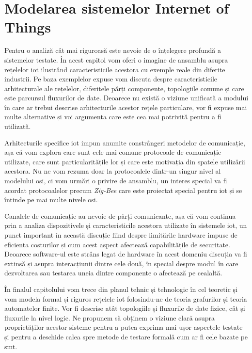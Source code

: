 \chapter{Modelarea sistemelor Internet of Things}

Pentru o analiză cât mai riguroasă este nevoie de o înțelegere profundă a sistemelor testate. În acest capitol vom oferi o imagine de ansamblu asupra rețelelor \acrshort{iot} ilustrând caracteristicile acestora cu exemple reale din diferite industrii. Pe baza exemplelor expuse vom discuta despre caracteristicile arhitecturale ale rețelelor, diferitele părți componente, topologiile comune și care este parcursul fluxurilor de date. Deoarece nu există o viziune unificată a modului în care ar trebui descrise arhitecturile acestor rețele particulare, vor fi expuse mai multe alternative și voi argumenta care este cea mai potrivită pentru a fi utilizată. 

Arhitecturile specifice \acrshort{iot} impun anumite constrângeri metodelor de comunicație, așa că vom explora care sunt cele mai comune protocoale de comunicație utilizate, care sunt particularitățile lor și care este motivația din spatele utilizării acestora. Nu ne vom rezuma doar la protocoalele dintr-un singur nivel al modelului \acrfull{osi}, ci vom urmări o privire de ansamblu, un interes special va fi acordat protocoalelor precum \textit{Zig-Bee} care este proiectat special pentru \acrshort{iot} și se întinde pe mai multe nivele \acrshort{osi}.

Canalele de comunicație au nevoie de părți comunicante, așa că vom continua prin a analiza dispozitivele și caracteristicile acestora utilizate în sistemele \acrshort{iot}, un punct important în această discuție fiind despre limitările hardware impuse de eficiența costurilor și cum acest aspect afectează capabilitățile de securitate. Deoarece software-ul este strâns legat de hardware în acest domeniu discuția va fi extinsă și asupra interacțiunii dintre cele două, în special despre modul în care dezvoltarea sau testarea uneia dintre componente o afectează pe cealaltă.

În finalul capitolului vom trece din planul tehnic și tehnologic în cel teoretic și vom modela formal și riguros rețelele \acrshort{iot} folosindu-ne de teoria grafurilor și teoria automatelor finite. Vor fi descrise atât topologiile și fluxurile de date fizice, cât și fluxurile la nivel logic. Ne propunem să obținem o viziune clară asupra proprietăților acestor sisteme pentru a putea exprima mai ușor aspectele testate și pentru a deschide calea spre metode de testare formală cum ar fi cele bazate pe \acrfull{smt}.

